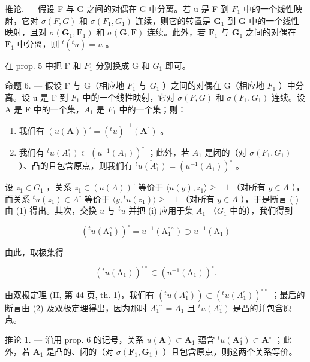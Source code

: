 推论. --- 假设 F 与 G 之间的对偶在 G 中分离。若 u 是 F 到 \(F_{1}\) 中的一个线性映射，它对 \(\sigma(F, G)\) 和 \(\sigma(F_{1}, G_{1})\) 连续，则它的转置是 \(\mathbf{G}_1\) 到 \(\mathbf{G}\) 中的一个线性映射，且对 \(\sigma (\mathbf{G}_1,\mathbf{F}_1)\) 和 \(\sigma (\mathbf{G},\mathbf{F})\) 连续。此外，若 \(\mathbf{F}_1\) 与 \(\mathbf{G}_1\) 之间的对偶在 \(\mathbf{F}_1\) 中分离，则 \(^{t}(^{t} u) = u\) 。

在 prop. 5 中把 F 和 \(F_{1}\) 分别换成 G 和 \(G_{1}\) 即可。

命题 6. --- 假设 F 与 G（相应地 \(F_{1}\) 与 \(G_{1}\) ）之间的对偶在 G（相应地 \(F_{1}\) ）中分离。设 u 是 F 到 \(F_{1}\) 中的一个线性映射，它对 \(\sigma(F, G)\) 和 \(\sigma(F_{1}, G_{1})\) 连续。设 A 是 F 中的一个集，\(A_{1}\) 是 \(F_{1}\) 中的一个集；则：

\begin{enumerate}
\def\labelenumi{(\roman{enumi})}
\item
  我们有 \((u(\mathbf{A}))^{\circ} = ({}^{t} u)^{-1} (\mathbf{A}^{\circ})\) 。
\item
  我们有 \(\overline{{}^{t}u(A_1^\circ)}\subset (u^{-1}(A_1))^{\circ}\) ；此外，若 \(A_1\) 是闭的（对 \(\sigma(F_1,G_1)\) ）、凸的且包含原点，则我们有 \(\overline{{}^{t}u(A_1^\circ)} = (u^{-1}(A_1))^{\circ}\) 。
\end{enumerate}

设 \(z_{1} \in G_{1}\) ，关系 \(z_{1} \in (u(A))^{\circ}\) 等价于 \(\langle u(y), z_{1} \rangle \geqslant -1\) （对所有 \(y \in A\) ），而关系 \({}^{t}u(z_{1}) \in A^{\circ}\) 等价于 \(\langle y, {}^{t}u(z_{1}) \rangle \geqslant -1\) （对所有 \(y \in A\) ），于是断言 (i) 由 (1) 得出。其次，交换 \(u\) 与 \({}^{t}u\) 并把 (i) 应用于集 \(A_{1}^{\circ}\) （\(G_{1}\) 中的），我们得到

\[
\left(^ {t} u \left(\mathrm{A} _ {1} ^ {\circ}\right)\right) ^ {\circ} = u ^ {- 1} \left(\mathrm{A} _ {1} ^ {\circ \circ}\right) \supset u ^ {- 1} \left(\mathrm{A} _ {1}\right)\tag{2}
\]

由此，取极集得

\[
\left(^ {t} u \left(\mathrm{A} _ {1} ^ {\circ}\right)\right) ^ {\circ \circ} \subset \left(u ^ {- 1} \left(\mathrm{A} _ {1}\right)\right) ^ {\circ}.
\]

由双极定理 (II, 第 44 页, th. 1)，我们有 \(\overline{(^t u(A_1^\circ))} \subset (^{t}u(A_1^\circ))^{\circ \circ}\) ；最后的断言由 (2) 及双极定理得出，因为那时 \(A_1^{\circ \circ} = A_1\) 且 \(^t u(A_1^\circ)\) 是凸的并包含原点。

推论 1. --- 沿用 prop. 6 的记号，关系 \(u(\mathbf{A}) \subset \mathbf{A}_1\) 蕴含 \(^t u(\mathbf{A}_1^\circ) \subset \mathbf{A}^\circ\) ；此外，若 \(\mathbf{A}_1\) 是凸的、闭的（对 \(\sigma(\mathbf{F}_1, \mathbf{G}_1)\) ）且包含原点，则这两个关系等价。

